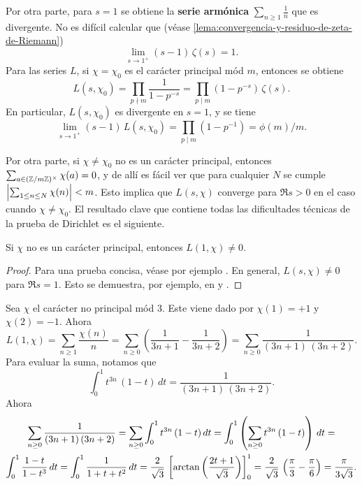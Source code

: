 Por otra parte, para $s = 1$ se obtiene la \textbf{serie armónica}
$\sum_{n\ge 1} \frac{1}{n}$ que es divergente. No es difícil calcular que (véase \ref{lema:convergencia-y-residuo-de-zeta-de-Riemann})
\begin{equation}
  \label{eq:residuo-de-zeta-en-1}
  \lim_{s\to 1^+} (s-1) \, \zeta (s) = 1.
\end{equation}
Para las series $L$, si $\chi = \chi_0$ es el carácter principal mód $m$,
entonces se obtiene
\[ L (s, \chi_0) = \prod_{p \nmid m} \frac{1}{1 - p^{-s}}
   = \prod_{p \mid m} (1 - p^{-s}) \, \zeta (s). \]
En particular, $L (s, \chi_0)$ es divergente en $s = 1$, y se tiene
\[ \lim_{s\to 1^+} (s-1)\,L (s, \chi_0) = \prod_{p \mid m} (1 - p^{-1})
   = \phi (m)/m. \]

Por otra parte, si $\chi \ne \chi_0$ no es un carácter principal, entonces
$\sum_{a \in (\mathbb{Z}/m\mathbb{Z})^\times} \chi (a) = 0$, y de allí es fácil ver que
para cualquier $N$ se cumple $\Bigl|\sum_{1 \le n \le N} \chi (n)\Bigr| < m$.
Esto implica que $L (s,\chi)$ converge para $\Re s > 0$ en el caso cuando
$\chi \ne \chi_0$. El resultado clave que contiene todas las dificultades
técnicas de la prueba de Dirichlet es el siguiente.

\begin{teorema}
  \label{thm:L(1,chi)}
  Si $\chi$ no es un carácter principal, entonces $L (1,\chi) \ne 0$.

  \begin{proof}
    Para una prueba concisa, véase por ejemplo \cite[\S 16.5]{Ireland-Rosen}.
    En general, $L (s,\chi) \ne 0$ para $\Re s = 1$. Esto se demuestra, por
    ejemplo, en \cite[Chapter~5]{Everiste-ANT} y
    \cite[Chapter~6]{Hlawka-Taschner-Schoissengeier}.
  \end{proof}
\end{teorema}

\begin{ejemplo}
  Sea $\chi$ el carácter no principal mód $3$. Este viene dado por
  $\chi (1) = +1$ y $\chi (2) = -1$. Ahora
  $$L (1,\chi) = \sum_{n \ge 1} \frac{\chi (n)}{n} = \sum_{n \ge 0} \left(\frac{1}{3n + 1} - \frac{1}{3n+2}\right) = \sum_{n \ge 0} \frac{1}{(3n+1)\,(3n+2)}.$$
  Para evaluar la suma, notamos que
  $$\int_0^1 t^{3n} \, (1-t) \, dt = \frac{1}{(3n+1)\,(3n+2)}.$$
  Ahora
  \begin{multline*}
    \sum_{n \ge 0} \frac{1}{(3n+1)\,(3n+2)} = \sum_{n \ge 0} \int_0^1 t^{3n} \, (1-t) \, dt = \int_0^1 \left(\sum_{n \ge 0} t^{3n} \, (1-t)\right) \, dt =\\
    \int_0^1 \frac{1-t}{1-t^3}\,dt = \int_0^1 \frac{1}{1 + t + t^2}\,dt = \frac{2}{\sqrt{3}}\,\left[\arctan \left(\frac{2t+1}{\sqrt{3}}\right)\right]_0^1 = \frac{2}{\sqrt{3}}\,\left(\frac{\pi}{3} - \frac{\pi}{6}\right) = \frac{\pi}{3\sqrt{3}}. \qedhere
  \end{multline*}
\end{ejemplo}

